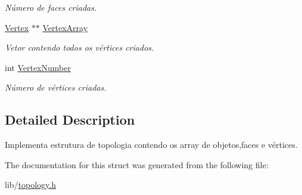\begin{DoxyCompactItemize}
\begin{DoxyCompactList}\small\item\em Número de faces criadas. \end{DoxyCompactList}\item 
\hypertarget{struct_topology___ac217ffd27b44631516c926f3f979bcc4}{\hyperlink{class_vertex}{Vertex} $\ast$$\ast$ \hyperlink{struct_topology___ac217ffd27b44631516c926f3f979bcc4}{Vertex\-Array}}\label{struct_topology___ac217ffd27b44631516c926f3f979bcc4}

\begin{DoxyCompactList}\small\item\em Vetor contendo todos os vértices criados. \end{DoxyCompactList}\item 
\hypertarget{struct_topology___ac56b1053994a57fe36414f40d0225079}{int \hyperlink{struct_topology___ac56b1053994a57fe36414f40d0225079}{Vertex\-Number}}\label{struct_topology___ac56b1053994a57fe36414f40d0225079}

\begin{DoxyCompactList}\small\item\em Número de vértices criadas. \end{DoxyCompactList}\end{DoxyCompactItemize}


\subsection{Detailed Description}
Implementa estrutura de topologia contendo os array de objetos,faces e vértices. 

The documentation for this struct was generated from the following file\-:\begin{DoxyCompactItemize}
\item 
lib/\hyperlink{topology_8h}{topology.\-h}\end{DoxyCompactItemize}
